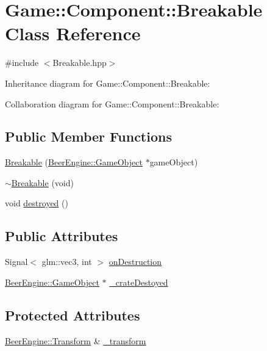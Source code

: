 \hypertarget{class_game_1_1_component_1_1_breakable}{}\section{Game\+:\+:Component\+:\+:Breakable Class Reference}
\label{class_game_1_1_component_1_1_breakable}


{\ttfamily \#include $<$Breakable.\+hpp$>$}



Inheritance diagram for Game\+:\+:Component\+:\+:Breakable\+:


Collaboration diagram for Game\+:\+:Component\+:\+:Breakable\+:
\subsection*{Public Member Functions}
\begin{DoxyCompactItemize}
\item 
\mbox{\hyperlink{class_game_1_1_component_1_1_breakable_ad739d120313be059576347fd7c691173}{Breakable}} (\mbox{\hyperlink{class_beer_engine_1_1_game_object}{Beer\+Engine\+::\+Game\+Object}} $\ast$game\+Object)
\item 
\mbox{\hyperlink{class_game_1_1_component_1_1_breakable_a865e322dd9c71227b699f85bd492b481}{$\sim$\+Breakable}} (void)
\item 
void \mbox{\hyperlink{class_game_1_1_component_1_1_breakable_a2b58c2c6c0132f8defc9b1e80220530b}{destroyed}} ()
\end{DoxyCompactItemize}
\subsection*{Public Attributes}
\begin{DoxyCompactItemize}
\item 
Signal$<$ glm\+::vec3, int $>$ \mbox{\hyperlink{class_game_1_1_component_1_1_breakable_ac0ae61567c2ac3615929e42bdb0ed735}{on\+Destruction}}
\item 
\mbox{\hyperlink{class_beer_engine_1_1_game_object}{Beer\+Engine\+::\+Game\+Object}} $\ast$ \mbox{\hyperlink{class_game_1_1_component_1_1_breakable_a1bead819f5f60d1bf354b80cf899853f}{\+\_\+crate\+Destoyed}}
\end{DoxyCompactItemize}
\subsection*{Protected Attributes}
\begin{DoxyCompactItemize}
\item 
\mbox{\hyperlink{class_beer_engine_1_1_transform}{Beer\+Engine\+::\+Transform}} \& \mbox{\hyperlink{class_game_1_1_component_1_1_breakable_a97c7499afa143aa9493c206adcb5eee0}{\+\_\+transform}}
\end{DoxyCompactItemize}
